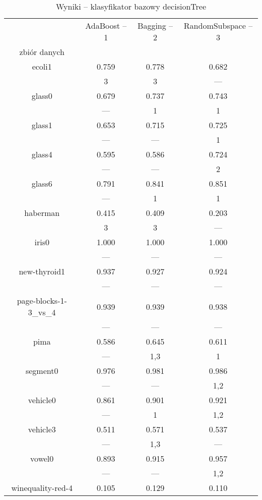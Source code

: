 \documentclass[a4paper,12pt]{article}
\begin{document}
\newpage
\begin{table}[H]
    \begin{center}
    \caption{Wyniki -- klasyfikator bazowy decisionTree}
    \label{tab:resultsDT}
    \begin{tabular}{|c|c|c|c|}
    \hline
    & AdaBoost -- 1 & Bagging -- 2 & RandomSubspace -- 3 \\
    zbiór danych & & &\\
    \hline
    \hline
    ecoli1 & 0.759 & 0.778 & 0.682\\
	& 3 & 3 & --- \\
    \hline
    glass0 & 0.679 & 0.737 & 0.743\\
	& --- & 1 & 1 \\
    \hline
    glass1 & 0.653 & 0.715 & 0.725 \\
	& --- & --- & 1 \\
    \hline
    glass4 & 0.595 & 0.586 & 0.724 \\
	& --- & --- & 2 \\
    \hline
    glass6 & 0.791 & 0.841 & 0.851 \\
	& --- & 1 & 1 \\
    \hline
    haberman & 0.415 & 0.409 & 0.203\\
	& 3 & 3 & --- \\
    \hline
    iris0 & 1.000 & 1.000 & 1.000\\
	& --- & --- & --- \\
    \hline
    new-thyroid1 & 0.937 & 0.927 & 0.924\\
	& --- & --- & --- \\
    \hline
    page-blocks-1-3\_vs\_4 & 0.939 & 0.939 & 0.938 \\
	& --- & --- & --- \\
    \hline
    pima & 0.586 & 0.645 & 0.611 \\
	& --- & 1,3 & 1 \\
    \hline
    segment0 & 0.976 & 0.981 & 0.986 \\
	& --- & --- & 1,2 \\
    \hline
    vehicle0 & 0.861 & 0.901 & 0.921 \\
	& --- & 1 & 1,2 \\
    \hline
    vehicle3 & 0.511 & 0.571 & 0.537 \\
	& --- & 1,3 & --- \\
    \hline
    vowel0 & 0.893 & 0.915 & 0.957 \\
	& --- & --- & 1,2 \\
    \hline
    winequality-red-4 & 0.105 & 0.129 & 0.110 \\

\end{tabular}
\end{center}
\end{table}
\end{document}
